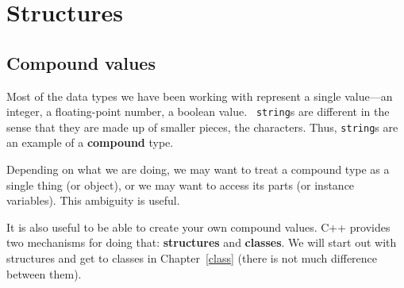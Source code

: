 





\chapter{Structures}
\label{structs}

\section{Compound values}

Most of the data types we have been working with represent a single
value---an integer, a floating-point number, a boolean value.  {\tt
string}s are different in the sense that they are made up of smaller
pieces, the characters.  Thus, {\tt string}s are an example of a
{\bf compound} type.

Depending on what we are doing, we may want to treat a compound type
as a single thing (or object), or we may want to access its parts (or
instance variables).  This ambiguity is useful.

It is also useful to be able to create your own compound values.  C++
provides two mechanisms for doing that: {\bf structures} and {\bf
classes}.  We will start out with structures and get to classes in
Chapter~\ref{class} (there is not much difference between them).

